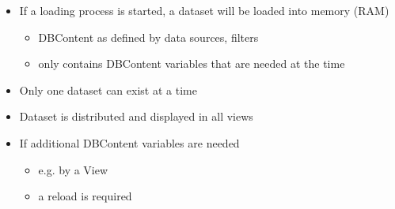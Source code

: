 \begin{itemize}
\item If a loading process is started, a dataset will be loaded into memory (RAM)
\begin{itemize}
\item DBContent as defined by data sources, filters
\item only contains DBContent variables that are needed at the time
\end{itemize}
\item Only one dataset can exist at a time
\item Dataset is distributed and displayed in all views
\item If additional DBContent variables are needed
\begin{itemize}
\item e.g. by a View
\item a reload is required
\end{itemize}
\end{itemize}

 
